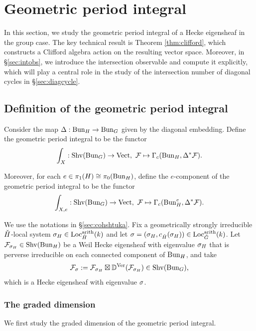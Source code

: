 \documentclass[reqno]{amsart}
\numberwithin{equation}{section}
\numberwithin{equation}{section}
\begin{document}
\section{Geometric period integral}\label{sec:geometricperiod}
In this section, we study the geometric period integral of a Hecke eigensheaf in the group case. The key technical result is Theorem \ref{thm:clifford}, which constructs a Clifford algebra action on the resulting vector space. Moreover, in \S\ref{sec:intobs}, we introduce the intersection observable and compute it explicitly, which will play a central role in the study of the intersection number of diagonal cycles in \S\ref{sec:diagcycle}.

\subsection{Definition of the geometric period integral}\label{sec:geometricperioddef}
Consider the map $\Delta:\operatorname{Bun}_H\to \operatorname{Bun}_G$ given by the diagonal embedding. Define the geometric period integral to be the functor \begin{equation}
    \int_X: \mathrm{Shv}(\operatorname{Bun}_G)\to \mathrm{Vect},~\mathcal{F}\mapsto \Gamma_c(\operatorname{Bun}_H, \Delta^*\mathcal{F}).
\end{equation}

Moreover, for each $e\in \pi_1(H)\cong \pi_0(\operatorname{Bun}_H)$, define the $e$-component of the geometric period integral to be the functor \begin{equation}
    \int_{X,e}:\mathrm{Shv}(\operatorname{Bun}_G)\to \mathrm{Vect},~\mathcal{F}\mapsto \Gamma_c(\operatorname{Bun}_H^e, \Delta^*\mathcal{F}).
\end{equation}

We use the notations in \S\ref{sec:cohshtuka}. Fix a geometrically strongly irreducible $\check{H}$-local system $\sigma_H\in \mathrm{Loc}_{\check{H}}^{\mathrm{arith}}(k)$ and let $\sigma=(\sigma_H, c_{\check{H}}(\sigma_H)) \in \mathrm{Loc}_{\check{G}}^{\mathrm{arith}}(k)$. Let $\mathcal{F}_{\sigma_H} \in \mathrm{Shv}(\operatorname{Bun}_H)$ be a Weil Hecke eigensheaf with eigenvalue $\sigma_H$ that is perverse irreducible on each connected component of $\operatorname{Bun}_H$, and take \begin{equation}\label{eq:eigensheaf}\mathcal{F}_{\sigma}:=\mathcal{F}_{\sigma_H}\boxtimes\mathbb{D}^{\mathrm{Ver}}(\mathcal{F}_{\sigma_H})\in \mathrm{Shv}(\operatorname{Bun}_G),\end{equation} which is a Hecke eigensheaf with eigenvalue $\sigma$. 

\subsubsection{The graded dimension}

We first study the graded dimension of the geometric period integral.
\end{document}
